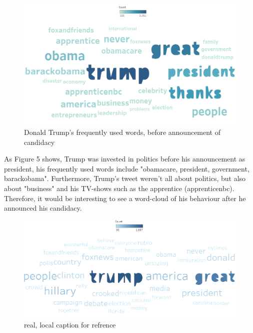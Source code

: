\documentclass[12pt]{article}
\begin{document}
\begin{figure}[H] %
	\centering %
\includegraphics [scale= .45]  {TrumpBeforeAnnouncementWordFinal}    %
	\caption[Optional caption] {Donald Trump's frequently used words, before announcement of candidacy}
	\label{fig:wordcloudBliz}

\end{figure}

As Figure 5 shows, Trump was invested in politics before his announcement as president, his frequently used words include "obamacare, president, government, barackobama". Furthermore, Trump's tweet weren't all about politics, but also about "business" and his TV-shows such as the apprentice (apprenticenbc). Therefore, it would be interesting to see a word-cloud of his behaviour after he announced his candidacy. 


\begin{figure}[H] %
	\centering %
\includegraphics [scale= .45]  {TrumpAfterAnnouncement}    %
	\caption[Optional caption] {real, local caption for refrence}
	\label{fig:wordcloudBliz}

\end{figure}
\end{document}
